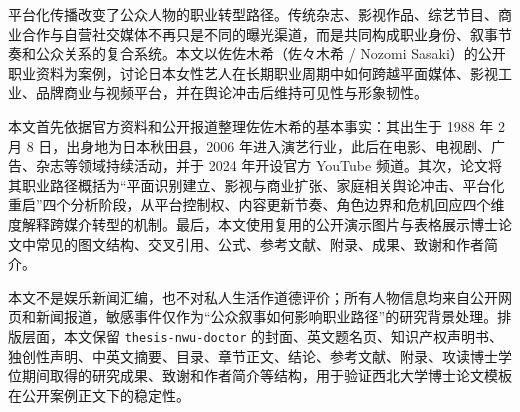 
平台化传播改变了公众人物的职业转型路径。传统杂志、影视作品、综艺节目、商业合作与自营社交媒体不再只是不同的曝光渠道，而是共同构成职业身份、叙事节奏和公众关系的复合系统。本文以佐佐木希（佐々木希 / Nozomi Sasaki）的公开职业资料为案例，讨论日本女性艺人在长期职业周期中如何跨越平面媒体、影视工业、品牌商业与视频平台，并在舆论冲击后维持可见性与形象韧性。

本文首先依据官方资料和公开报道整理佐佐木希的基本事实：其出生于 1988 年 2 月 8 日，出身地为日本秋田县，2006 年进入演艺行业，此后在电影、电视剧、广告、杂志等领域持续活动，并于 2024 年开设官方 YouTube 频道。其次，论文将其职业路径概括为“平面识别建立、影视与商业扩张、家庭相关舆论冲击、平台化重启”四个分析阶段，从平台控制权、内容更新节奏、角色边界和危机回应四个维度解释跨媒介转型的机制。最后，本文使用复用的公开演示图片与表格展示博士论文中常见的图文结构、交叉引用、公式、参考文献、附录、成果、致谢和作者简介。

本文不是娱乐新闻汇编，也不对私人生活作道德评价；所有人物信息均来自公开网页和新闻报道，敏感事件仅作为“公众叙事如何影响职业路径”的研究背景处理。排版层面，本文保留 \texttt{thesis-nwu-doctor} 的封面、英文题名页、知识产权声明书、独创性声明、中英文摘要、目录、章节正文、结论、参考文献、附录、攻读博士学位期间取得的研究成果、致谢和作者简介等结构，用于验证西北大学博士论文模板在公开案例正文下的稳定性。

\nwuKeywordsZhLine

